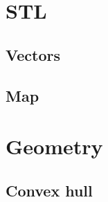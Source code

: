 \section{STL}
\subsection{Vectors}
\raggedbottom
\hrulefill
\subsection{Map}
\raggedbottom
\hrulefill

\section{Geometry}
\subsection{Convex hull}
\raggedbottom
\hrulefill

